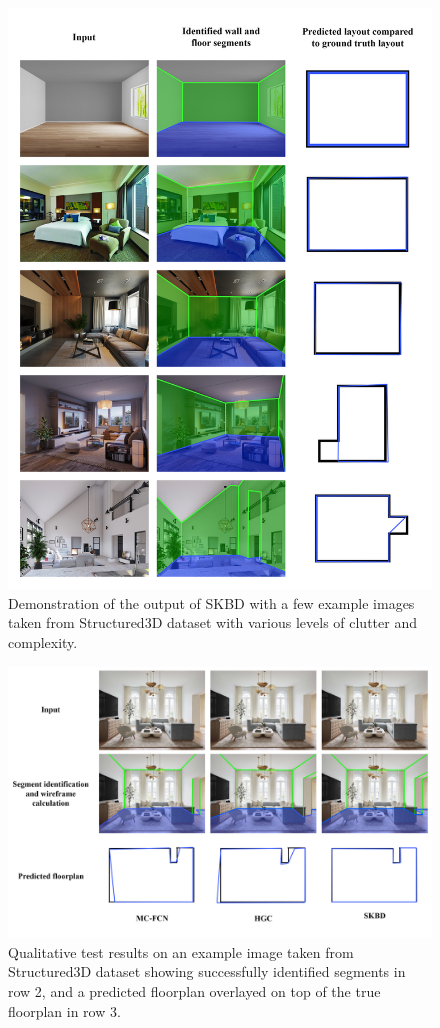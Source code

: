 \begin{figure}[htbp]
\centering
\includegraphics[width=0.9\linewidth]{images/results2.png}
\caption{\label{fig:resultlayouts}Demonstration of the output of SKBD with a few example images taken from Structured3D dataset\cite{zheng2020structured3d} with various levels of clutter and complexity.}
\end{figure}

\begin{figure}[htbp]
\centering
\includegraphics[width=0.9\linewidth]{images/comparison_test_images.png}
\caption{\label{fig:comparisontest}Qualitative test results on an example image taken from Structured3D dataset\cite{zheng2020structured3d} showing successfully identified segments in row 2, and a predicted floorplan overlayed on top of the true floorplan in row 3.}
\end{figure}

